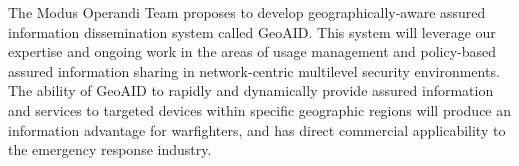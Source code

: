 \documentclass{sbir}
\begin{document}
\listoffixmes
\newpage
 
\tableofcontents
\newpage
 
 
{The Modus Operandi Team proposes to develop geographically-aware assured information dissemination system called GeoAID.  This system will leverage our expertise and ongoing work in the areas of usage management and policy-based assured information sharing in network-centric multilevel security environments. The ability of GeoAID to rapidly and dynamically provide assured information and services to targeted devices within specific geographic regions will produce an information advantage for warfighters, and has direct commercial applicability to the emergency response industry.}
 
\end{document}
